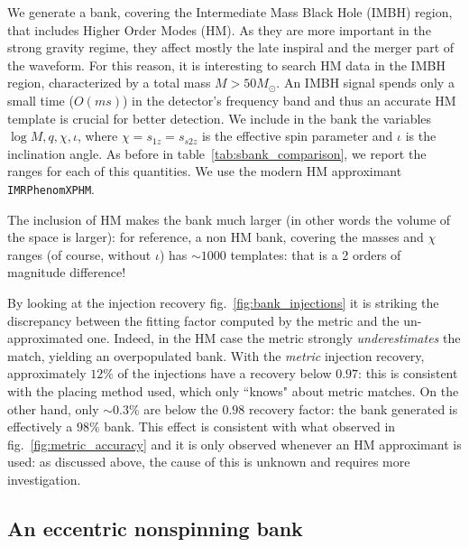 \documentclass[twocolumn,showpacs,preprintnumbers,nofootinbib,prd,
superscriptaddress,10pt]{revtex4-2}
\begin{document}
We generate a bank, covering the Intermediate Mass Black Hole (IMBH) region, that includes Higher Order Modes (HM). As they are more important in the strong gravity regime, they affect mostly the late inspiral and the merger part of the waveform.
For this reason, it is interesting to search HM data in the IMBH region, characterized by a total mass $M>50 M_\odot$. An IMBH signal spends only a small time ($O(ms)$) in the detector's frequency band and thus an accurate HM template is crucial for better detection.
We include in the bank the variables $\log M, q, \chi, \iota$, where $\chi=s_{1z}=s_{s2z}$ is the effective spin parameter and $\iota$ is the inclination angle.
As before in table~\ref{tab:sbank_comparison}, we report the ranges for each of this quantities. We use the modern HM approximant \texttt{IMRPhenomXPHM}.

The inclusion of HM makes the bank much larger (in other words the volume of the space is larger): for reference, a non HM bank, covering the masses and $\chi$ ranges (of course, without $\iota$) has $\sim 1000$ templates: that is a 2 orders of magnitude difference!

By looking at the injection recovery fig.~\ref{fig:bank_injections} it is striking the discrepancy between the fitting factor computed by the metric and the un-approximated one. Indeed, in the HM case the metric strongly {\it underestimates} the match, yielding an overpopulated bank. With the {\it metric} injection recovery, approximately $12\%$ of the injections have a recovery below $0.97$: this is consistent with the placing method used, which only ``knows" about metric matches. On the other hand, only $\sim 0.3\%$ are below the $0.98$ recovery factor: the bank generated is effectively a $98\%$ bank.
This effect is consistent with what observed in fig.~\ref{fig:metric_accuracy} and it is only observed whenever an HM approximant is used: as discussed above, the cause of this is unknown and requires more investigation.

\subsection{An eccentric nonspinning bank}\label{sec:eccentric_bank}
\end{document}
